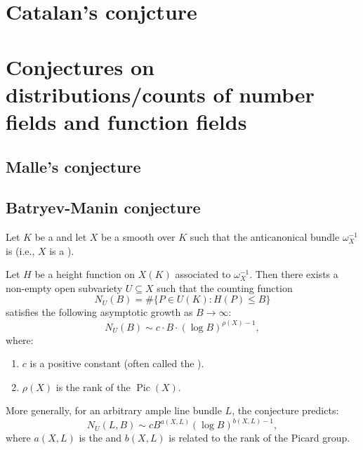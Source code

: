 \section{Catalan's conjcture}



\section{Conjectures on distributions/counts of number fields and function fields }

\subsection{Malle's conjecture}

\subsection{Batryev-Manin conjecture}

\begin{conjecture} \label{conjecture:batyrev_manin_conjecture}
Let $K$ be a  and let $X$ be a smooth  over $K$ such that the anticanonical bundle $\omega_X^{-1}$ is  (i.e., $X$ is a ). 

Let $H$ be a height function on $X(K)$ associated to $\omega_X^{-1}$. Then there exists a non-empty open subvariety $U \subseteq X$ such that the counting function 
$$N_U(B) = \#\{P \in U(K) : H(P) \leq B\}$$
satisfies the following asymptotic growth as $B \to \infty$:
$$N_U(B) \sim c \cdot B \cdot (\log B)^{\rho(X) - 1},$$
where:
\begin{enumerate}
    \item $c$ is a positive constant (often called the ).
    \item $\rho(X)$ is the rank of the  $\operatorname{Pic}(X)$.
\end{enumerate}

More generally, for an arbitrary ample line bundle $L$, the conjecture predicts:
$$N_U(L, B) \sim c B^{a(X, L)} (\log B)^{b(X, L) - 1},$$
where $a(X, L)$ is the  and $b(X, L)$ is related to the rank of the Picard group.
\end{conjecture}


